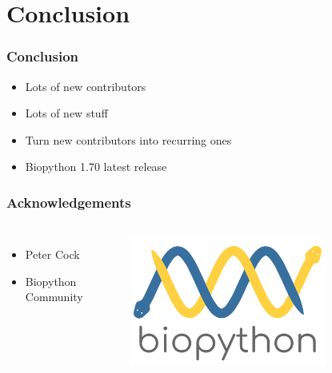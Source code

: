 \documentclass[trans]{beamer}
\begin{document}
\section{Conclusion}
\frame
{
  \frametitle{Conclusion}

  \begin{itemize}
  \item Lots of new contributors
  \item Lots of new stuff
  \item Turn new contributors into recurring ones
  \item Biopython 1.70 latest release
  \end{itemize}
}

\frame
{
  \frametitle{Acknowledgements}

  \begin{minipage}{1\textwidth}
  \begin{columns}
  \begin{itemize}
  \item Peter Cock
  \item Biopython Community
  \end{itemize}
  \includegraphics[width=0.7\textwidth]{figures/biopython_logo_s.png}
  \end{columns}
  \end{minipage}

  \vspace{1.0cm}

}
\end{document}
